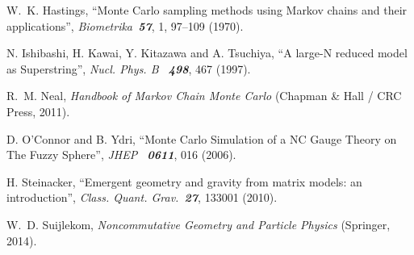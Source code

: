\documentclass[12pt,a4paper]{article}
\begin{document}
\begin{thebibliography}{99}
W.~K. Hastings,
``Monte  Carlo sampling  methods using  Markov chains  and their applications'',
{\it Biometrika\ \bf 57}, 1, 97--109 (1970).

N. Ishibashi, H. Kawai, Y. Kitazawa and A. Tsuchiya,
``A large-N reduced model as Superstring'',
{\it Nucl. Phys. B \ \bf 498}, 467 (1997).

R.~M. Neal,
{\it Handbook of Markov Chain Monte Carlo\/}
(Chapman \& Hall / CRC Press, 2011).

D. O’Connor and B. Ydri,
``Monte Carlo Simulation of a NC Gauge Theory on The Fuzzy Sphere'',
{\it JHEP \ \bf 0611}, 016 (2006).

H. Steinacker,
``Emergent geometry and gravity from matrix models: an introduction'',
{\it Class. Quant. Grav.\ \bf 27}, 133001 (2010).

W.~D. Suijlekom,
{\it Noncommutative Geometry and Particle Physics\/}
(Springer, 2014).






 
 
\end{thebibliography}
\end{document}
